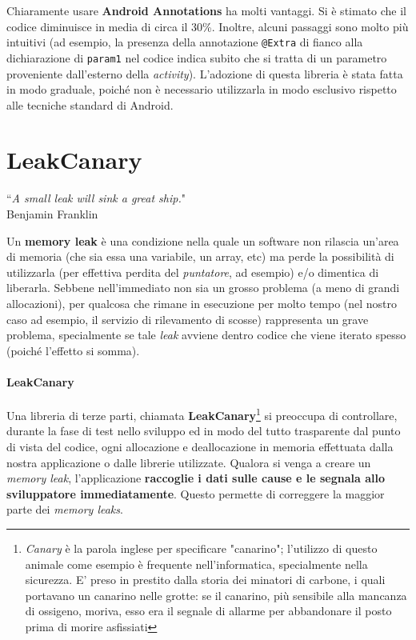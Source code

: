 \documentclass[a4paper,10pt]{memoir}
\begin{document}
Chiaramente usare \textbf{Android Annotations} ha molti vantaggi. Si è stimato che il codice diminuisce in media di circa il 30\%. Inoltre, alcuni passaggi sono molto più intuitivi (ad esempio, la presenza della annotazione \texttt{@Extra} di fianco alla dichiarazione di \texttt{param1} nel codice indica subito che si tratta di un parametro proveniente dall'esterno della \textit{activity}). L'adozione di questa libreria è stata fatta in modo graduale, poiché non è necessario utilizzarla in modo esclusivo rispetto alle tecniche standard di Android.

\clearpage

\section{LeakCanary}

\begin{flushright}
``\textit{A small leak will sink a great ship.}" \\ Benjamin Franklin
\end{flushright}

\medskip

Un \textbf{memory leak} è una condizione nella quale un software non rilascia un'area di memoria (che sia essa una variabile, un array, etc) ma perde la possibilità di utilizzarla (per effettiva perdita del \textit{puntatore}, ad esempio) e/o dimentica di liberarla. Sebbene nell'immediato non sia un grosso problema (a meno di grandi allocazioni), per qualcosa che rimane in esecuzione per molto tempo (nel nostro caso ad esempio, il servizio di rilevamento di scosse) rappresenta un grave problema, specialmente se tale \textit{leak} avviene dentro codice che viene iterato spesso (poiché l'effetto si somma).

\paragraph{LeakCanary} Una libreria di terze parti, chiamata \textbf{LeakCanary}\footnote{\textit{Canary} è la parola inglese per specificare "canarino"; l'utilizzo di questo animale come esempio è frequente nell'informatica, specialmente nella sicurezza. E' preso in prestito dalla storia dei minatori di carbone, i quali portavano un canarino nelle grotte: se il canarino, più sensibile alla mancanza di ossigeno, moriva, esso era il segnale di allarme per abbandonare il posto prima di morire asfissiati} si preoccupa di controllare, durante la fase di test nello sviluppo ed in modo del tutto trasparente dal punto di vista del codice, ogni allocazione e deallocazione in memoria effettuata dalla nostra applicazione o dalle librerie utilizzate. Qualora si venga a creare un \textit{memory leak}, l'applicazione \textbf{raccoglie i dati sulle cause e le segnala allo sviluppatore immediatamente}. Questo permette di correggere la maggior parte dei \textit{memory leaks}.
\end{document}
